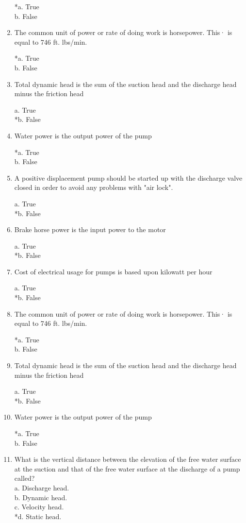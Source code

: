 \begin{enumerate}
*a. True \\
b. False 


\item  The common unit of power or rate of doing work is horsepower. This· is equal to 746 ft. lbs/min. 

*a. True \\
b. False 


\item  Total dynamic head is the sum of the suction head and the discharge head minus the friction head 

a. True \\
*b. False 


\item  Water power is the output power of the pump 

*a. True \\
b. False 


\item  A positive displacement pump should be started up with the discharge valve closed in order to avoid any problems with "air lock". 

a. True \\
*b. False 


\item  Brake horse power is the input power to the motor 

a. True \\
*b. False 


\item  Cost of electrical usage for pumps is based upon kilowatt per hour 

a. True \\
*b. False 


\item  The common unit of power or rate of doing work is horsepower. This· is equal to 746 ft. lbs/min. 

*a. True \\
b. False 


\item  Total dynamic head is the sum of the suction head and the discharge head minus the friction head 

a. True \\
*b. False 


\item  Water power is the output power of the pump 

*a. True \\
b. False 

\item  What is the vertical distance between the elevation of the free water surface at the suction and that of the free water surface at the discharge of a pump called?\\
a.	Discharge head.\\
b.	Dynamic head.\\
c.	Velocity head.\\
*d.	Static head.\\


\end{enumerate}
